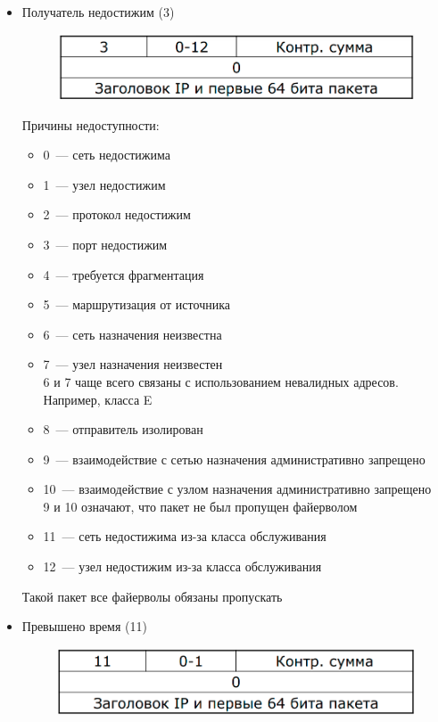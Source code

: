 
\begin{itemize}
    \item Получатель недостижим (3)\\
    \begin{figure}[H]
        \centering
        \includegraphics[width=15cm]{images/02/10}
        \end{figure}

    Причины недоступности:
    \begin{itemize}
        \item 0~--- сеть недостижима
        \item 1~--- узел недостижим
        \item 2~--- протокол недостижим
        \item 3~--- порт недостижим
        \item 4~--- требуется фрагментация
        \item 5~--- маршрутизация от источника
        \item 6~--- сеть назначения неизвестна
        \item 7~--- узел назначения неизвестен\\
        6 и 7 чаще всего связаны с использованием невалидных адресов. Например, класса E
        \item 8~--- отправитель изолирован
        \item 9~--- взаимодействие с сетью назначения административно запрещено
        \item 10~--- взаимодействие с узлом назначения административно запрещено\\
        9 и 10 означают, что пакет не был пропущен файерволом
        \item 11~--- сеть недостижима из-за класса обслуживания
        \item 12~--- узел недостижим из-за класса обслуживания
    \end{itemize}
    Такой пакет все файерволы обязаны пропускать
    \item Превышено время (11)\\
    \begin{figure}[H]
        \centering
        \includegraphics[width=15cm]{images/02/11}

\end{figure}
\end{itemize}
